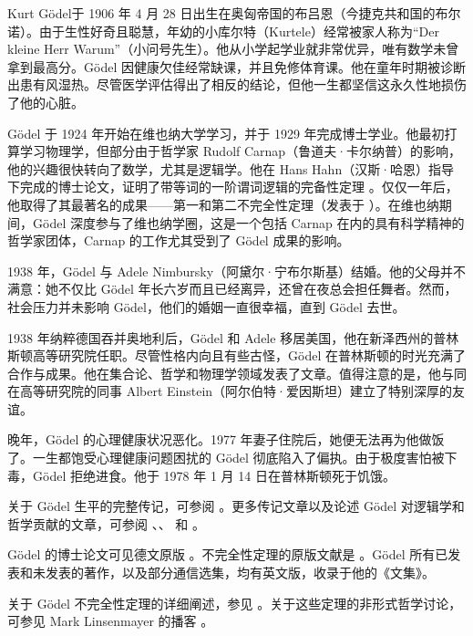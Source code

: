 \documentclass[../../../include/open-logic-section]{subfiles}
\begin{document}



Kurt Gödel于 1906 年 4 月 28 日出生在奥匈帝国的布吕恩（今捷克共和国的布尔诺）。由于生性好奇且聪慧，年幼的小库尔特（Kurtele）经常被家人称为“Der kleine Herr Warum”（小问号先生）。他从小学起学业就非常优异，唯有数学未曾拿到最高分。Gödel 因健康欠佳经常缺课，并且免修体育课。他在童年时期被诊断出患有风湿热。尽管医学评估得出了相反的结论，但他一生都坚信这永久性地损伤了他的心脏。

Gödel 于 1924 年开始在维也纳大学学习，并于 1929 年完成博士学业。他最初打算学习物理学，但部分由于哲学家 Rudolf Carnap（鲁道夫·卡尔纳普）的影响，他的兴趣很快转向了数学，尤其是逻辑学。他在 Hans Hahn（汉斯·哈恩）指导下完成的博士论文，证明了带等词的一阶谓词逻辑的完备性定理 \citep{Godel1929}。仅仅一年后，他取得了其最著名的成果——第一和第二不完全性定理（发表于 \citealt{Godel1931}）。在维也纳期间，Gödel 深度参与了维也纳学圈，这是一个包括 Carnap 在内的具有科学精神的哲学家团体，Carnap 的工作尤其受到了 Gödel 成果的影响。

1938 年，Gödel 与 Adele Nimbursky（阿黛尔·宁布尔斯基）结婚。他的父母并不满意：她不仅比 Gödel 年长六岁而且已经离异，还曾在夜总会担任舞者。然而，社会压力并未影响 Gödel，他们的婚姻一直很幸福，直到 Gödel 去世。

1938 年纳粹德国吞并奥地利后，Gödel 和 Adele 移居美国，他在新泽西州的普林斯顿高等研究院任职。尽管性格内向且有些古怪，Gödel 在普林斯顿的时光充满了合作与成果。他在集合论、哲学和物理学领域发表了文章。值得注意的是，他与同在高等研究院的同事 Albert Einstein（阿尔伯特·爱因斯坦）建立了特别深厚的友谊。

晚年，Gödel 的心理健康状况恶化。1977 年妻子住院后，她便无法再为他做饭了。一生都饱受心理健康问题困扰的 Gödel 彻底陷入了偏执。由于极度害怕被下毒，Gödel 拒绝进食。他于 1978 年 1 月 14 日在普林斯顿死于饥饿。

\begin{reading}
关于 Gödel 生平的完整传记，可参阅 \citet{Dawson1997}。更多传记文章以及论述 Gödel 对逻辑学和哲学贡献的文章，可参阅 \citet{Wang1990}、\citet{Baaz2011}、\citet{Takeuti2003} 和 \citet{Sigmund2007}。

Gödel 的博士论文可见德文原版 \citep{Godel1929}。不完全性定理的原版文献是 \citep{Godel1931}。Gödel 所有已发表和未发表的著作，以及部分通信选集，均有英文版，收录于他的《文集》\citet{Godel1986,Godel1990}。

关于 Gödel 不完全性定理的详细阐述，参见 \citet{Smith2013}。关于这些定理的非形式哲学讨论，可参见 Mark Linsenmayer 的播客 \citep{Linsenmayer2014}。
\end{reading}
\end{document}
